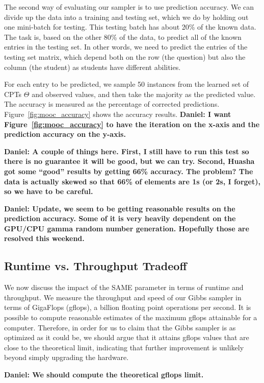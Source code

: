 \documentclass{article} %
\begin{document}
The second way of evaluating our sampler is to use prediction accuracy. We can divide up the data
into a training and testing set, which we do by holding out one mini-batch for testing. This testing
batch has about 20\% of the known data. The task is, based on the other 80\% of the data, to predict
all of the known entries in the testing set. In other words, we need to predict the entries of the
testing set matrix, which depend both on the row (the question) but also the column (the student) as
students have different abilities.

For each entry to be predicted, we sample 50 instances from the learned set of CPTs $\Theta$ and
observed values, and then take the majority as the predicted value. The accuracy is measured as the
percentage of corrected predictions.  Figure~\ref{fig:mooc_accuracy} shows the accuracy results.
\textbf{Daniel: I want Figure~\ref{fig:mooc_accuracy} to have the iteration on the x-axis and the
prediction accuracy on the y-axis.}

\textbf{Daniel: A couple of things here. First, I still have to run this test so there is no
guarantee it will be good, but we can try. Second, Huasha got some ``good'' results by getting 66\%
accuracy. The problem? The data is actually skewed so that 66\% of elements are 1s (or 2s, I
forget), so we have to be careful.}

\textbf{Daniel: Update, we seem to be getting reasonable results on the prediction accuracy. Some of
it is very heavily dependent on the GPU/CPU gamma random number generation. Hopefully those are
resolved this weekend.}

\subsection{Runtime vs. Throughput Tradeoff}\label{ssec:tradeoff}

We now discuss the impact of the SAME parameter in terms of runtime and throughput. We measure the
throughput and speed of our Gibbs sampler in terms of GigaFlops (gflops), a billion floating point
operations per second. It is possible to compute reasonable estimates of the maximum gflops
attainable for a computer. Therefore, in order for us to claim that the Gibbs sampler is as
optimized as it could be, we should argue that it attains gflops values that are close to the
theoretical limit, indicating that further improvement is unlikely beyond simply upgrading the
hardware.

\textbf{Daniel: We should compute the theoretical gflops limit.}
\end{document}
